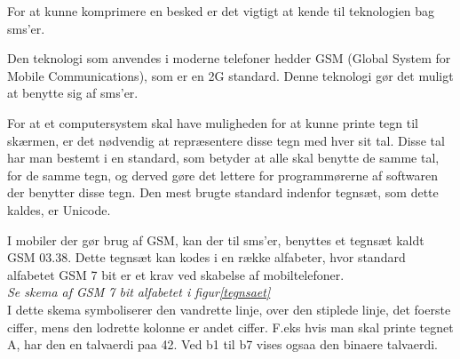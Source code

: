 For at kunne komprimere en besked er det vigtigt at kende til teknologien bag sms'er.

Den teknologi som anvendes i moderne telefoner hedder GSM (Global System for Mobile Communications), som er en 2G standard. Denne teknologi gør det muligt at benytte sig af sms'er.\cite{GSM_term}

For at et computersystem skal have muligheden for at kunne printe tegn til skærmen, er det nødvendig at repræsentere disse tegn med hver sit tal. Disse tal har man bestemt i en standard, som betyder at alle skal benytte de samme tal, for de samme tegn, og derved gøre det lettere for programmørerne af softwaren der benytter disse tegn. Den mest brugte standard indenfor tegnsæt, som dette kaldes, er Unicode.\cite{UNICODE_standard}

I mobiler der gør brug af GSM, kan der til sms'er, benyttes et tegnsæt kaldt GSM 03.38. Dette tegnsæt kan kodes i en række alfabeter, hvor standard alfabetet GSM 7 bit er et krav ved skabelse af mobiltelefoner.\cite{GSM_7_bit}
\\
\emph {Se skema af GSM 7 bit alfabetet i figur\ref{tegnsaet}}
\\
I dette skema symboliserer den vandrette linje, over den stiplede linje, det foerste ciffer, mens den lodrette kolonne er andet ciffer. F.eks hvis man skal printe tegnet A, har den en talvaerdi paa 42. Ved b1 til b7 vises ogsaa den binaere talvaerdi.

